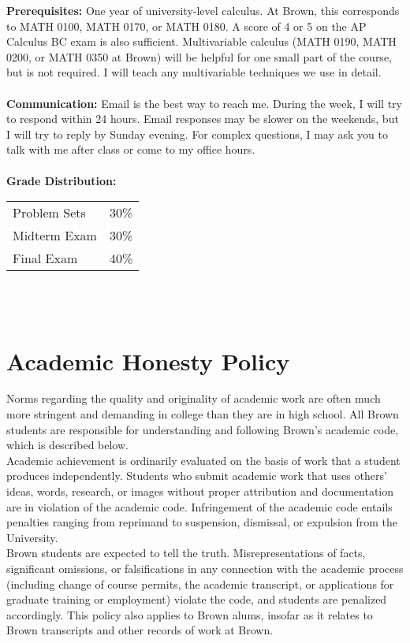\documentclass[11pt]{article}
\begin{document}
\textbf {Prerequisites:} One year of university-level calculus. At Brown, this corresponds to MATH 0100, MATH 0170, or MATH 0180. A score of 4 or 5 on the AP Calculus BC exam is also sufficient. Multivariable calculus (MATH 0190, MATH 0200, or MATH 0350 at Brown) will be helpful for one small part of the course, but is not required. I will teach any multivariable techniques we use in detail.\\\\
\textbf{Communication: }Email is the best way to reach me. During the week, I will try to respond within 24 hours. Email responses may be slower on the weekends, but I will try to reply by Sunday evening. For complex questions, I may ask you to talk with me after class or come to my office hours.
 \\\\
\textbf {Grade Distribution:} \\
\hspace*{40mm}
\begin{tabular}{ l l }
Problem Sets & 30\% \\
Midterm Exam  & 30\% \\
Final Exam  & 40\%
\end{tabular} \\\\

\section*{Academic Honesty Policy}
Norms regarding the quality and originality of academic work are often much more stringent and demanding in college than they are in high school. All Brown students are responsible for understanding and following Brown’s academic code, which is described below. \\

Academic achievement is ordinarily evaluated on the basis of work that a student produces independently. Students who submit academic work that uses others’ ideas, words, research, or images without proper attribution and documentation are in violation of the academic code. Infringement of the academic code entails penalties ranging from reprimand to suspension, dismissal, or expulsion from the University. \\

Brown students are expected to tell the truth. Misrepresentations of facts, significant omissions, or falsifications in any connection with the academic process (including change of course permits, the academic transcript, or applications for graduate training or employment) violate the code, and students are penalized accordingly. This policy also applies to Brown alums, insofar as it relates to Brown transcripts and other records of work at Brown. \\
\end{document}
